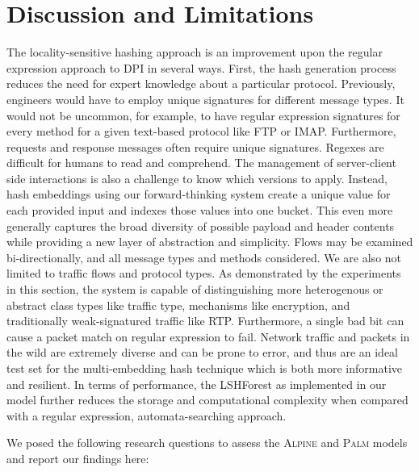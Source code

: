 \section{Discussion and Limitations}

The locality-sensitive hashing approach is an improvement upon the regular expression approach to DPI in several ways. First, the hash generation process reduces the need for expert knowledge about a particular protocol. Previously, engineers would have to employ unique signatures for different message types. It would not be uncommon, for example, to have regular expression signatures for every method for a given text-based protocol like FTP or IMAP. Furthermore, requests and response messages often require unique signatures. Regexes are difficult for humans to read and comprehend. The management of server-client side interactions is also a challenge to know which versions to apply. Instead, hash embeddings using our forward-thinking system create a unique value for each provided input and indexes those values into one bucket. This even more generally captures the broad diversity of possible payload and header contents while providing a new layer of abstraction and simplicity. Flows may be examined bi-directionally, and all message types and methods considered. We are also not limited to traffic flows and protocol types. As demonstrated by the experiments in this section, the system is capable of distinguishing more heterogenous or abstract class types like traffic type, mechanisms like encryption, and traditionally weak-signatured traffic like RTP. Furthermore, a single bad bit can cause a packet match on regular expression to fail. Network traffic and packets in the wild are extremely diverse and can be prone to error, and thus are an ideal test set for the multi-embedding hash technique which is both more informative and resilient. In terms of performance, the LSHForest as implemented in our model further reduces the storage and computational complexity when compared with a regular expression, automata-searching approach.

We posed the following research questions to assess the \textsc{Alpine} and \textsc{Palm} models and report our findings here:

